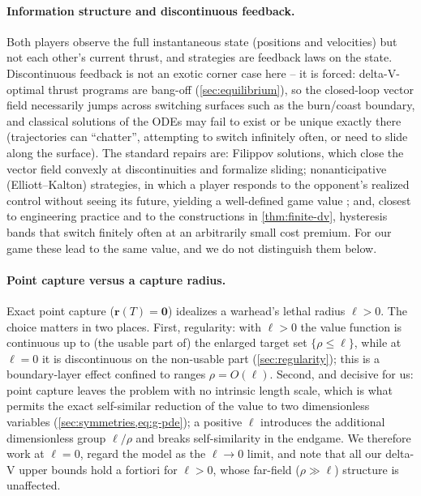 \documentclass{article}
\renewcommand{\vec}[1]{\mathbf{#1}}
\theoremstyle{remark}
\begin{document}
\paragraph{Information structure and discontinuous feedback.}
Both players observe the full instantaneous state (positions and velocities)
but not each other's current thrust, and strategies are feedback laws on the
state.  Discontinuous feedback is not an exotic corner case here -- it is
forced: delta-V-optimal thrust programs are bang-off
(\cref{sec:equilibrium}), so the closed-loop vector field necessarily jumps
across switching surfaces such as the burn/coast boundary, and classical
solutions of the ODEs may fail to exist or be unique exactly there
(trajectories can ``chatter'', attempting to switch infinitely often, or
need to slide along the surface).  The standard repairs are: Filippov
solutions, which close the vector field convexly at discontinuities and
formalize sliding; nonanticipative (Elliott--Kalton) strategies, in which a
player responds to the opponent's realized control without seeing its
future, yielding a well-defined game value
\cite{evanssouganidis1984,bardi1997}; and, closest to engineering practice
and to the constructions in \cref{thm:finite-dv}, hysteresis bands that
switch finitely often at an arbitrarily small cost premium.  For our game
these lead to the same value, and we do not distinguish them below.

\paragraph{Point capture versus a capture radius.}
Exact point capture ($\vec r(T) = \vec 0$) idealizes a warhead's lethal
radius $\ell > 0$.  The choice matters in two places.  First, regularity:
with $\ell > 0$ the value function is continuous up to (the usable part of)
the enlarged target set $\{\rho \le \ell\}$, while at $\ell = 0$ it is
discontinuous on the non-usable part (\cref{sec:regularity}); this is a
boundary-layer effect confined to ranges $\rho = O(\ell)$.  Second, and
decisive for us: point capture leaves the problem with no intrinsic length
scale, which is what permits the exact self-similar reduction of the value to
two dimensionless variables (\cref{sec:symmetries,eq:g-pde}); a positive
$\ell$ introduces the additional dimensionless group $\ell/\rho$ and breaks
self-similarity in the endgame.  We therefore work at $\ell = 0$, regard the
model as the $\ell \to 0$ limit, and note that all our delta-V upper bounds
hold a fortiori for $\ell > 0$, whose far-field ($\rho \gg \ell$) structure
is unaffected.
\end{document}
